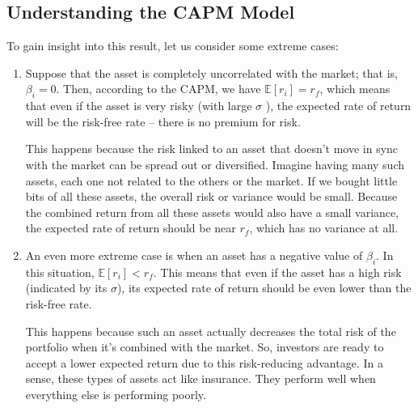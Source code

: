 \documentclass[13pt]{article}
\theoremstyle{definition}
\theoremstyle{remark}
\newcommand{\EE}{\mathbb{E}}
\begin{document}
\subsection{Understanding the CAPM Model}
To gain insight into this result, let us consider some extreme cases:
\begin{enumerate}
    \item Suppose that the asset is completely uncorrelated with the market; that is, $\beta_i=0$. Then, according to the CAPM, we have $\EE[r_i    ]=r_f$, which means that even if the asset is very risky (with large $\sigma$ ), the expected rate of return will be the risk-free rate -- there is no premium for risk. 
    
    This happens because the risk linked to an asset that doesn't move in sync with the market can be spread out or diversified. Imagine having many such assets, each one not related to the others or the market. If we bought little bits of all these assets, the overall risk or variance would be small. Because the combined return from all these assets would also have a small variance, the expected rate of return should be near $r_f$, which has no variance at all.
    \item An even more extreme case is when an asset has a negative value of $\beta_i$. In this situation, $\EE[r_i]<r_f$. This means that even if the asset has a high risk (indicated by its $\sigma$), its expected rate of return should be even lower than the risk-free rate.

This happens because such an asset actually decreases the total risk of the portfolio when it's combined with the market. So, investors are ready to accept a lower expected return due to this risk-reducing advantage. In a sense, these types of assets act like insurance. They perform well when everything else is performing poorly.
\end{enumerate}
\end{document}
